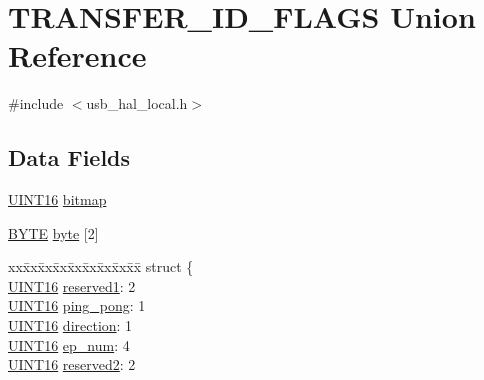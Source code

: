 \hypertarget{union_t_r_a_n_s_f_e_r___i_d___f_l_a_g_s}{}\section{T\+R\+A\+N\+S\+F\+E\+R\+\_\+\+I\+D\+\_\+\+F\+L\+A\+G\+S Union Reference}
\label{union_t_r_a_n_s_f_e_r___i_d___f_l_a_g_s}


{\ttfamily \#include $<$usb\+\_\+hal\+\_\+local.\+h$>$}

\subsection*{Data Fields}
\begin{DoxyCompactItemize}
\item 
\hyperlink{_generic_type_defs_8h_acfa284fa8026c4aace2728f7f15d6c13}{U\+I\+N\+T16} \hyperlink{union_t_r_a_n_s_f_e_r___i_d___f_l_a_g_s_ac8565d3bec583a08b68ba70cccd8c523}{bitmap}
\item 
\hyperlink{_generic_type_defs_8h_a4ae1dab0fb4b072a66584546209e7d58}{B\+Y\+T\+E} \hyperlink{union_t_r_a_n_s_f_e_r___i_d___f_l_a_g_s_a8b4bf4f4e2fa0034e326d8407131dc8b}{byte} \mbox{[}2\mbox{]}
\item 
\begin{tabbing}
xx\=xx\=xx\=xx\=xx\=xx\=xx\=xx\=xx\=\kill
struct \{\\
\>\hyperlink{_generic_type_defs_8h_acfa284fa8026c4aace2728f7f15d6c13}{UINT16} \hyperlink{union_t_r_a_n_s_f_e_r___i_d___f_l_a_g_s_abe161ac56af59685b709222f264666ba}{reserved1}: 2\\
\>\hyperlink{_generic_type_defs_8h_acfa284fa8026c4aace2728f7f15d6c13}{UINT16} \hyperlink{union_t_r_a_n_s_f_e_r___i_d___f_l_a_g_s_abdf43dbd12a71698f5bb0ae544ffd0a1}{ping\_pong}: 1\\
\>\hyperlink{_generic_type_defs_8h_acfa284fa8026c4aace2728f7f15d6c13}{UINT16} \hyperlink{union_t_r_a_n_s_f_e_r___i_d___f_l_a_g_s_a11a3671185a4ccfd2821e8e3d29c616d}{direction}: 1\\
\>\hyperlink{_generic_type_defs_8h_acfa284fa8026c4aace2728f7f15d6c13}{UINT16} \hyperlink{union_t_r_a_n_s_f_e_r___i_d___f_l_a_g_s_ae9fe38ed33c7b06d9964c055ea1ef217}{ep\_num}: 4\\
\>\hyperlink{_generic_type_defs_8h_acfa284fa8026c4aace2728f7f15d6c13}{UINT16} \hyperlink{union_t_r_a_n_s_f_e_r___i_d___f_l_a_g_s_af0ee3e33fad359064e98e75399c9da1f}{reserved2}: 2\\

\end{tabbing}
\end{DoxyCompactItemize}
